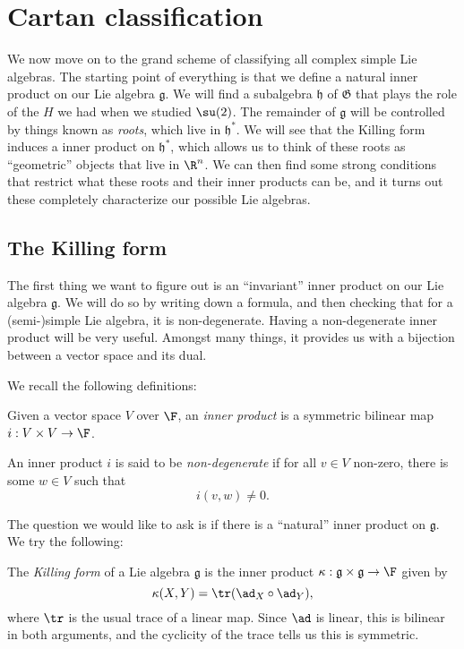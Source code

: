 \documentclass[a4paper]{article}
\begin{document}
\section{Cartan classification}
We now move on to the grand scheme of classifying all complex simple Lie algebras. The starting point of everything is that we define a natural inner product on our Lie algebra $\mathfrak{g}$. We will find a subalgebra $\mathfrak{h}$ of $\mathfrak{G}$ that plays the role of the $H$ we had when we studied $\su(2)$. The remainder of $\mathfrak{g}$ will be controlled by things known as \emph{roots}, which live in $\mathfrak{h}^*$. We will see that the Killing form induces a inner product on $\mathfrak{h}^*$, which allows us to think of these roots as ``geometric'' objects that live in $\R^n$. We can then find some strong conditions that restrict what these roots and their inner products can be, and it turns out these completely characterize our possible Lie algebras.

\subsection{The Killing form}
The first thing we want to figure out is an ``invariant'' inner product on our Lie algebra $\mathfrak{g}$. We will do so by writing down a formula, and then checking that for a (semi-)simple Lie algebra, it is non-degenerate. Having a non-degenerate inner product will be very useful. Amongst many things, it provides us with a bijection between a vector space and its dual.

We recall the following definitions:
\begin{defi}
  Given a vector space $V$ over $\F$, an \emph{inner product} is a symmetric bilinear map $i: V \times V \to \F$.
\end{defi}

\begin{defi}
  An inner product $i$ is said to be \emph{non-degenerate} if for all $v \in V$ non-zero, there is some $w \in V$ such that
  \[
    i(v, w) \not= 0.
  \]
\end{defi}

The question we would like to ask is if there is a ``natural'' inner product on $\mathfrak{g}$. We try the following:

\begin{defi}
  The \emph{Killing form} of a Lie algebra $\mathfrak{g}$ is the inner product $\kappa: \mathfrak{g} \times \mathfrak{g} \to \F$ given by
  \[
    \kappa(X, Y) = \tr(\ad_X \circ \ad_Y),
  \]
  where $\tr$ is the usual trace of a linear map. Since $\ad$ is linear, this is bilinear in both arguments, and the cyclicity of the trace tells us this is symmetric.
\end{defi}
\end{document}
